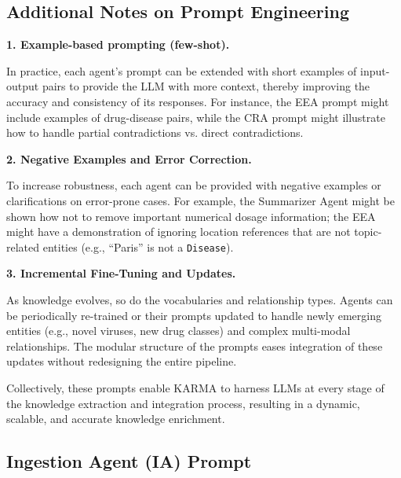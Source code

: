 \documentclass{article}
\begin{document}
\subsection{Additional Notes on Prompt Engineering}

\noindent
\textbf{1. Example-based prompting (few-shot).}  

In practice, each agent’s prompt can be extended with short examples of input-output pairs to provide the LLM with more context, thereby improving the accuracy and consistency of its responses. For instance, the EEA prompt might include examples of drug-disease pairs, while the CRA prompt might illustrate how to handle partial contradictions vs. direct contradictions.

\vspace{1mm}
\noindent
\textbf{2. Negative Examples and Error Correction.}  

To increase robustness, each agent can be provided with negative examples or clarifications on error-prone cases. For example, the Summarizer Agent might be shown how not to remove important numerical dosage information; the EEA might have a demonstration of ignoring location references that are not topic-related entities (e.g., “Paris” is not a \texttt{Disease}).

\vspace{1mm}
\noindent
\textbf{3. Incremental Fine-Tuning and Updates.}  

As knowledge evolves, so do the vocabularies and relationship types. Agents can be periodically re-trained or their prompts updated to handle newly emerging entities (e.g., novel viruses, new drug classes) and complex multi-modal relationships. The modular structure of the prompts eases integration of these updates without redesigning the entire pipeline.

Collectively, these prompts enable KARMA to harness LLMs at every stage of the knowledge extraction and integration process, resulting in a dynamic, scalable, and accurate knowledge enrichment.
\newpage

\clearpage
\onecolumn
\subsection{Ingestion Agent (IA) Prompt}
\label{appendix:ia_prompt}
\end{document}
